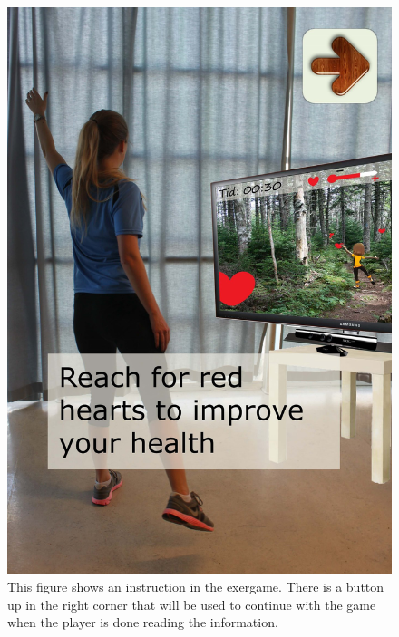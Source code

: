 \begin{figure} [H]
\centering

\includegraphics[scale=0.13]{introKineEng.jpg}
\caption[Instruction]{This figure shows an instruction in the exergame. There is a button up in the right corner that will be used to continue with the game when the player is done reading the information.}
\label{fig:kineintro}
\end{figure}

